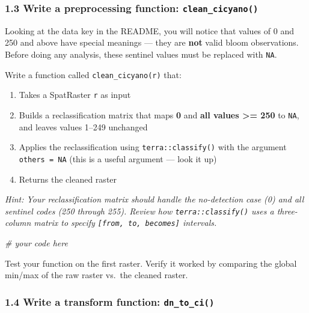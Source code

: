 \documentclass[
]{article}
\newenvironment{Shaded}{\begin{snugshade}}{\end{snugshade}}
\newcommand{\CommentTok}[1]{\textcolor[rgb]{0.56,0.35,0.01}{\textit{#1}}}
\providecommand{\tightlist}{%
  \setlength{\itemsep}{0pt}\setlength{\parskip}{0pt}}
\begin{document}
\subsubsection{\texorpdfstring{1.3 Write a preprocessing function:
\texttt{clean\_cicyano()}}{1.3 Write a preprocessing function: clean\_cicyano()}}\label{write-a-preprocessing-function-clean_cicyano}

Looking at the data key in the README, you will notice that values of 0
and 250 and above have special meanings --- they are \textbf{not} valid
bloom observations. Before doing any analysis, these sentinel values
must be replaced with \texttt{NA}.

Write a function called \texttt{clean\_cicyano(r)} that:

\begin{enumerate}
\def\labelenumi{\arabic{enumi}.}
\tightlist
\item
  Takes a SpatRaster \texttt{r} as input
\item
  Builds a reclassification matrix that maps \textbf{0} and \textbf{all
  values \textgreater= 250} to \texttt{NA}, and leaves values 1--249
  unchanged
\item
  Applies the reclassification using \texttt{terra::classify()} with the
  argument \texttt{others\ =\ NA} (this is a useful argument --- look it
  up)
\item
  Returns the cleaned raster
\end{enumerate}

\emph{Hint: Your reclassification matrix should handle the no-detection
case (0) and all sentinel codes (250 through 255). Review how
\texttt{terra::classify()} uses a three-column matrix to specify
\texttt{{[}from,\ to,\ becomes{]}} intervals.}

\begin{Shaded}
\begin{Highlighting}[]
\CommentTok{\# your code here}
\end{Highlighting}
\end{Shaded}

Test your function on the first raster. Verify it worked by comparing
the global min/max of the raw raster vs.~the cleaned raster.

\subsubsection{\texorpdfstring{1.4 Write a transform function:
\texttt{dn\_to\_ci()}}{1.4 Write a transform function: dn\_to\_ci()}}\label{write-a-transform-function-dn_to_ci}
\end{document}
